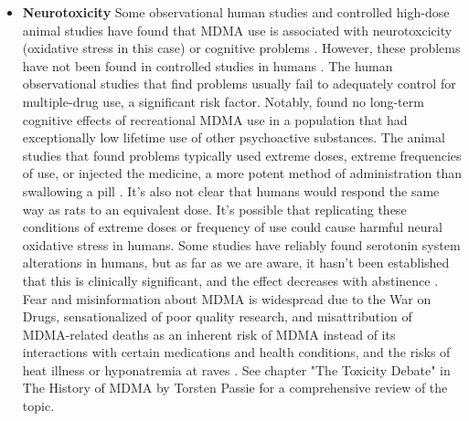\documentclass[12pt,letterpaper]{book}
\begin{document}
\begin{itemize}
    \item \textbf{Neurotoxicity}
    	Some observational human studies and controlled high-dose animal studies have found that MDMA use is associated with neurotoxcicity (oxidative stress in this case) or cognitive problems \cite{passieHistory}. However, these problems have not been found in controlled studies in humans \cite{halpernMormonRavers}. The human observational studies that find problems usually fail to adequately control for multiple-drug use, a significant risk factor. Notably, \textcite{halpernMormonRavers} found no long-term cognitive effects of recreational MDMA use in a population that had exceptionally low lifetime use of other psychoactive substances. The animal studies that found problems typically used extreme doses, extreme frequencies of use, or injected the medicine, a more potent method of administration than swallowing a pill \cite{passieHistory}. It's also not clear that humans would respond the same way as rats to an equivalent dose. It's possible that replicating these conditions of extreme doses or frequency of use could cause harmful neural oxidative stress in humans. Some studies have reliably found serotonin system alterations in humans, but as far as we are aware, it hasn't been established that this is clinically significant, and the effect decreases with abstinence \cite{gouzoulis2006neurotoxicity}. Fear and misinformation about MDMA is widespread due to the War on Drugs, sensationalized of poor quality research, and misattribution of MDMA-related deaths as an inherent risk of MDMA instead of its interactions with certain medications and health conditions, and the risks of heat illness or hyponatremia at raves \cite{passieHistory}. See chapter "The Toxicity Debate" in The History of MDMA by Torsten Passie for a comprehensive review of the topic.
	

\end{itemize}
\end{document}
